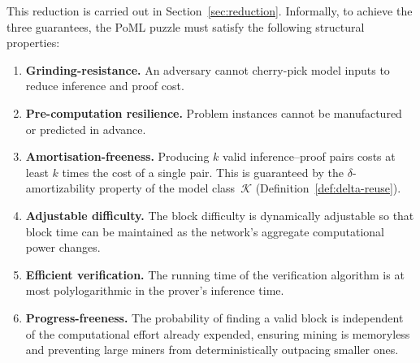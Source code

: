 This reduction is carried out in Section~\ref{sec:reduction}. Informally, to achieve the three guarantees, the PoML puzzle must satisfy the following structural properties:

\begin{enumerate}
    \item \textbf{Grinding-resistance.} An adversary cannot cherry-pick model inputs to reduce inference and proof cost. 

    \item \textbf{Pre-computation resilience.} Problem instances cannot be manufactured or predicted in advance.

    \item \textbf{Amortisation-freeness.} Producing $k$ valid inference--proof pairs costs at least $k$ times the cost of a single pair. This is guaranteed by the $\delta$-amortizability property of the model class~$\mathcal{K}$ (Definition~\ref{def:delta-reuse}).
    
    \item \textbf{Adjustable difficulty.} The block difficulty is dynamically adjustable so that block time can be maintained as the network's aggregate computational power changes.

    \item \textbf{Efficient verification.} The running time of the verification algorithm is at most polylogarithmic in the prover's inference time.

    \item \textbf{Progress-freeness.} The probability of finding a valid block is independent of the computational effort already expended, ensuring mining is memoryless and preventing large miners from deterministically outpacing smaller ones.
\end{enumerate}


